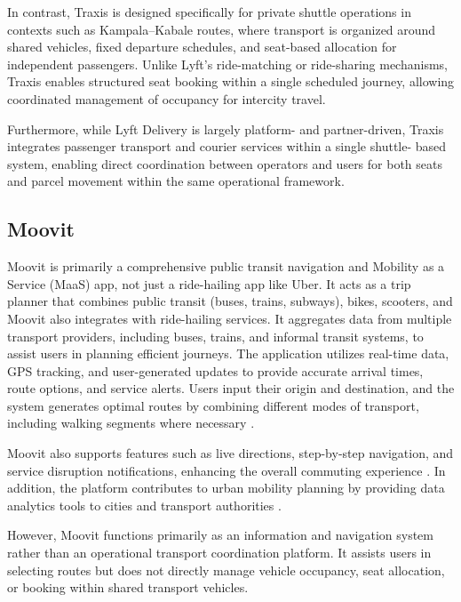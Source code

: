 In contrast, Traxis is designed specifically for private shuttle operations in
contexts such as Kampala–Kabale routes, where transport is organized around
shared vehicles, fixed departure schedules, and seat-based allocation for
independent passengers. Unlike Lyft’s ride-matching or ride-sharing mechanisms,
Traxis enables structured seat booking within a single scheduled journey,
allowing coordinated management of occupancy for intercity travel.


Furthermore, while Lyft Delivery is largely platform- and partner-driven, Traxis
integrates passenger transport and courier services within a single shuttle-
based system, enabling direct coordination between operators and users for both
seats and parcel movement within the same operational framework.




\subsection{Moovit}
Moovit is primarily a comprehensive public transit navigation and Mobility as a
Service (MaaS) app, not just a ride-hailing app like Uber. It acts as a trip
planner that combines public transit (buses, trains, subways), bikes, scooters,
and Moovit also integrates with ride-hailing services. It aggregates data from
multiple transport providers, including buses, trains, and informal transit
systems, to assist users in planning efficient journeys. The application
utilizes real-time data, GPS tracking, and user-generated updates to provide
accurate arrival times, route options, and service alerts. Users input their
origin and destination, and the system generates optimal routes by combining
different modes of transport, including walking segments where necessary
\cite{moovit2026about}.


Moovit also supports features such as live directions, step-by-step navigation,
and service disruption notifications, enhancing the overall commuting experience
\cite{moovit2026navigating}. In addition, the platform contributes to urban
mobility planning by providing data analytics tools to cities and transport
authorities \cite{moovit2026about}.


However, Moovit functions primarily as an information and navigation system
rather than an operational transport coordination platform. It assists users in
selecting routes but does not directly manage vehicle occupancy, seat
allocation, or booking within shared transport vehicles.


